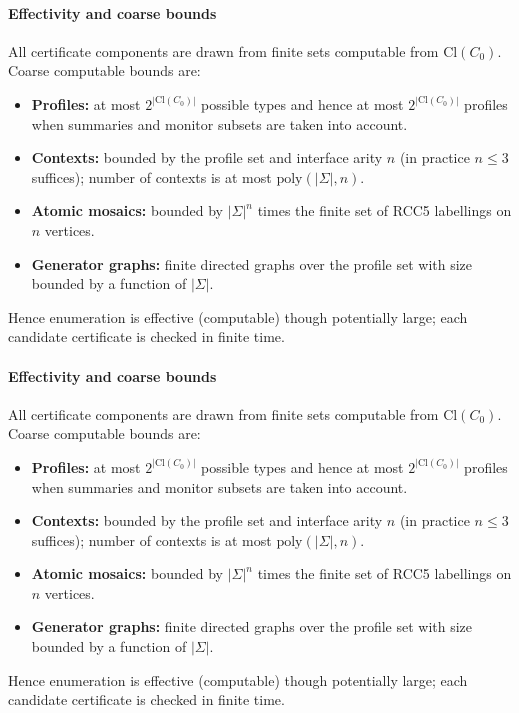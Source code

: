 \documentclass[11pt]{article}
\newcommand{\Cl}{\mathrm{Cl}}
\begin{document}
\paragraph{Effectivity and coarse bounds}
All certificate components are drawn from finite sets computable from $\Cl(C_0)$.
Coarse computable bounds are:
\begin{itemize}
  \item \textbf{Profiles:} at most $2^{|\Cl(C_0)|}$ possible types and hence
    at most $2^{|\Cl(C_0)|}$ profiles when summaries and monitor subsets are
    taken into account.
  \item \textbf{Contexts:} bounded by the profile set and interface arity $n$
    (in practice $n\le 3$ suffices); number of contexts is at most
    $\mathrm{poly}(|\Sigma|,n)$.
  \item \textbf{Atomic mosaics:} bounded by $|\Sigma|^n$ times the finite set
    of RCC5 labellings on $n$ vertices.
  \item \textbf{Generator graphs:} finite directed graphs over the profile set
    with size bounded by a function of $|\Sigma|$.
\end{itemize}
Hence enumeration is effective (computable) though potentially large; each
candidate certificate is checked in finite time.

\paragraph{Effectivity and coarse bounds}
All certificate components are drawn from finite sets computable from $\Cl(C_0)$.
Coarse computable bounds are:
\begin{itemize}
  \item \textbf{Profiles:} at most $2^{|\Cl(C_0)|}$ possible types and hence
    at most $2^{|\Cl(C_0)|}$ profiles when summaries and monitor subsets are
    taken into account.
  \item \textbf{Contexts:} bounded by the profile set and interface arity $n$
    (in practice $n\le 3$ suffices); number of contexts is at most
    $\mathrm{poly}(|\Sigma|,n)$.
  \item \textbf{Atomic mosaics:} bounded by $|\Sigma|^n$ times the finite set
    of RCC5 labellings on $n$ vertices.
  \item \textbf{Generator graphs:} finite directed graphs over the profile set
    with size bounded by a function of $|\Sigma|$.
\end{itemize}
Hence enumeration is effective (computable) though potentially large; each
candidate certificate is checked in finite time.
\end{document}
